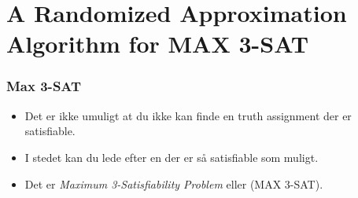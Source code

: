 \documentclass{beamer}
\begin{document}
\section{A Randomized Approximation Algorithm for MAX 3-SAT}
\label{sec:label}

\begin{frame}
  \frametitle{Max 3-SAT}
  \begin{itemize}
  \item Det er ikke umuligt at du ikke kan finde en truth assignment der er satisfiable. 
  \item I stedet kan du lede efter en der er så satisfiable som muligt. 
  \item Det er \textit{Maximum 3-Satisfiability Problem} eller (MAX 3-SAT). 
  \end{itemize}
\end{frame}
\end{document}
